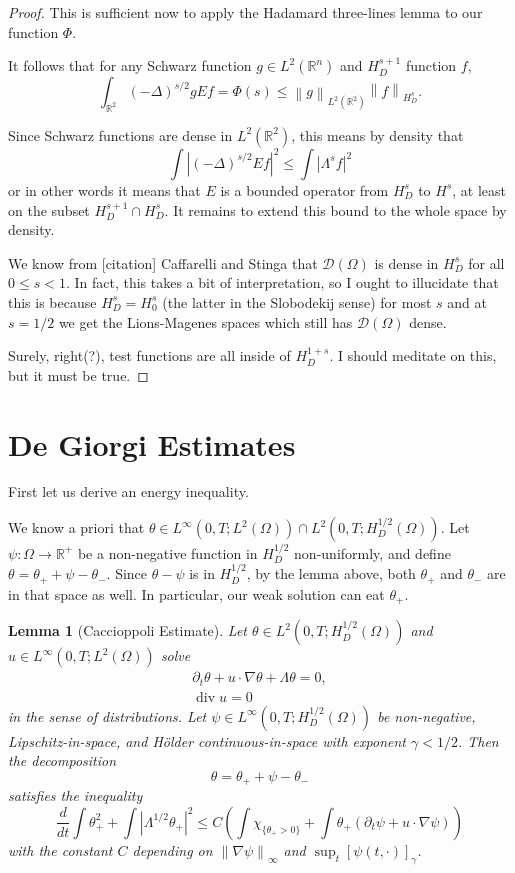 \documentclass[11pt]{amsart}
\newtheorem{lemma}[theorem]{Lemma}
\theoremstyle{remark}
\newcommand{\R}{\mathbb{R}}
\newcommand{\norm}[1]{\left\lVert#1\right\rVert}
\newcommand{\paren}[1]{\left( #1 \right)}
\newcommand{\bracket}[1]{\left[ #1 \right]}
\newcommand{\abs}[1]{\left\lvert #1 \right\rvert}
\newcommand{\del}{\partial}
\newcommand{\grad}{\nabla}
\newcommand{\ddt}{\frac{d}{dt}}
\renewcommand{\div}{\operatorname{div}}
\newcommand{\Laplace}{\Delta}
\newcommand{\indic}[1]{\chi_{\{#1\}}}
\newcommand{\test}{\mathcal{D}}
\begin{document}
\begin{proof}
This is sufficient now to apply the Hadamard three-lines lemma to our function $\Phi$.  

It follows that for any Schwarz function $g \in L^2(\R^n)$ and $H_D^{s+1}$ function $f$, 
\[ \int_{\R^2} \paren{-\Laplace}^{s/2} g E f = \Phi(s) \leq \norm{g}_{L^2(\R^2)} \norm{f}_{H_D^s}. \]

Since Schwarz functions are dense in $L^2(\R^2)$, this means by density that 
\[ \int \abs{ \paren{-\Laplace}^{s/2} E f }^2 \leq \int \abs{\Lambda^s f}^2 \]
or in other words it means that $E$ is a bounded operator from $H_D^s$ to $H^s$, at least on the subset $H_D^{s+1} \cap H_D^s$.  It remains to extend this bound to the whole space by density.  

We know from [citation] Caffarelli and Stinga that $\test(\Omega)$ is dense in $H_D^s$ for all $0 \leq s < 1$.  In fact, this takes a bit of interpretation, so I ought to illucidate that this is because $H_D^s = H_0^s$ (the latter in the Slobodekij sense) for most $s$ and at $s=1/2$ we get the Lions-Magenes spaces which still has $\test(\Omega)$ dense.  

Surely, right(?), test functions are all inside of $H_D^{1+s}$.  I should meditate on this, but it must be true.  
\end{proof}


\section{De Giorgi Estimates}

First let us derive an energy inequality.  

We know a priori that $\theta \in L^\infty(0,T; L^2(\Omega)) \cap L^2(0,T; H_D^{1/2}(\Omega))$.  Let $\psi: \Omega \to \R^+$ be a non-negative function in $H_D^{1/2}$ non-uniformly, and define $\theta = \theta_+ + \psi - \theta_-$.  Since $\theta - \psi$ is in $H_D^{1/2}$, by the lemma above, both $\theta_+$ and $\theta_-$ are in that space as well.  In particular, our weak solution can eat $\theta_+$.  

\begin{lemma}[Caccioppoli Estimate]
Let $\theta \in L^2(0,T; H_D^{1/2}(\Omega))$ and $u \in L^\infty(0,T; L^2(\Omega))$ solve
\begin{align*}
\del_t \theta + u\cdot \grad \theta + \Lambda \theta = 0,
\\ \div u = 0
\end{align*}
in the sense of distributions.  Let $\psi \in L^\infty(0,T; H_D^{1/2}(\Omega))$ be non-negative, Lipschitz-in-space, and H\"{o}lder continuous-in-space with exponent $\gamma < 1/2$.  Then the decomposition
\[ \theta = \theta_+ + \psi - \theta_- \]
satisfies the inequality
\[ \ddt \int \theta_+^2 + \int \abs{\Lambda^{1/2} \theta_+}^2 \leq C \paren{ \int \indic{\theta_+ > 0} + \int \theta_+ (\del_t \psi + u\cdot\grad\psi) } \]
with the constant $C$ depending on $\norm{\grad \psi}_\infty$ and $\sup_t \bracket{\psi(t,\cdot)}_\gamma$.  

\end{lemma}
\end{document}

